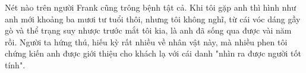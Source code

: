 Nét nào trên người Frank cũng trông bệnh tật cả. Khi tôi gặp anh thì hình như anh mới khoảng ba mươi tư tuổi thôi, nhưng tôi không nghĩ, từ cái vóc dáng gầy gò và thể trạng suy nhược trước mắt tôi kia, là anh đã sống qua được vài năm rồi. Người ta hứng thú, hiếu kỳ rất nhiều về nhân vật này, mà nhiều phen tôi chứng kiến anh được giới thiệu cho khách lạ với cái danh "nhìn ra được người tốt tính".